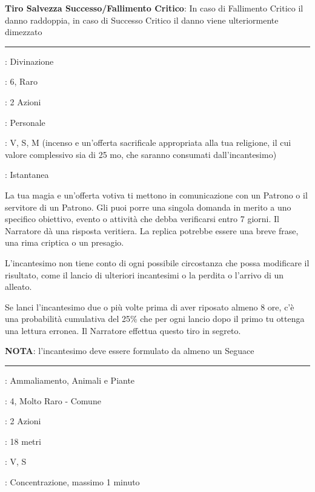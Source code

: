 \begin{multicols}{2}
\textbf{Tiro Salvezza Successo/Fallimento Critico}: In caso di Fallimento Critico il danno raddoppia, in caso di Successo Critico il danno viene ulteriormente dimezzato

\smallskip\noindent\rule{\linewidth}{2pt} \hypertarget{Divinazione}{}\smallskip{}
\noindent
\begin{description}[noitemsep, topsep=0pt, parsep=0pt, partopsep=0pt, leftmargin=0cm, labelwidth=2.8cm]
	\item[\textbf{Lista di Magia}]: Divinazione
	\item[\textbf{Livello}]: 6, Raro
	\item[\textbf{T. di Lancio}]: 2 Azioni
	\item[\textbf{Gittata}]: Personale
	\item[\textbf{Componenti}]: V, S, M (incenso e un'offerta sacrificale appropriata alla tua religione, il cui valore complessivo sia di 25 mo, che saranno consumati dall'incantesimo)
	\item[\textbf{Durata}]: Istantanea
\end{description}

La tua magia e un'offerta votiva ti mettono in comunicazione con un Patrono o il servitore di un Patrono. Gli puoi porre una singola domanda in merito a uno specifico obiettivo, evento o attività che debba verificarsi entro 7 giorni. Il Narratore dà una risposta veritiera. La replica potrebbe essere una breve frase, una rima criptica o un presagio.

L'incantesimo non tiene conto di ogni possibile circostanza che possa modificare il risultato, come il lancio di ulteriori incantesimi o la perdita o l'arrivo di un alleato.

Se lanci l'incantesimo due o più volte prima di aver riposato almeno 8 ore, c'è una probabilità cumulativa del 25\% che per ogni lancio dopo il primo tu ottenga una lettura erronea. Il Narratore effettua questo tiro in segreto.

\textbf{NOTA}: l'incantesimo deve essere formulato da almeno un Seguace

\smallskip\noindent\rule{\linewidth}{2pt} \hypertarget{Dominare Bestie}{}\smallskip{}
\noindent
\begin{description}[noitemsep, topsep=0pt, parsep=0pt, partopsep=0pt, leftmargin=0cm, labelwidth=2.8cm]
	\item[\textbf{Lista di Magia}]: Ammaliamento, Animali e Piante
	\item[\textbf{Livello}]: 4, Molto Raro - Comune
	\item[\textbf{T. di Lancio}]: 2 Azioni
	\item[\textbf{Gittata}]: 18 metri
	\item[\textbf{Componenti}]: V, S
	\item[\textbf{Durata}]: Concentrazione, massimo 1 minuto
\end{description}


\end{multicols}

